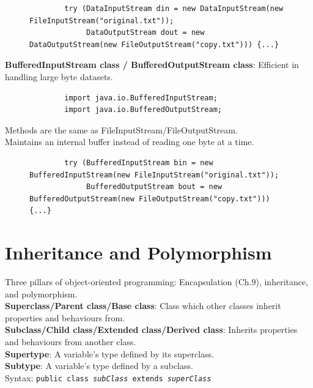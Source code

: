 \documentclass{article}
\begin{document}
\begin{figure}[h!]
	\begin{verbatim}
		try (DataInputStream din = new DataInputStream(new FileInputStream("original.txt"));
		     DataOutputStream dout = new DataOutputStream(new FileOutputStream("copy.txt"))) {...}
	\end{verbatim}
\end{figure}

\textbf{BufferedInputStream class / BufferedOutputStream class}: Efficient in handling large byte datasets.

\begin{figure}[h!]
	\begin{verbatim}
		import java.io.BufferedInputStream;
		import java.io.BufferedOutputStream;
	\end{verbatim}
\end{figure}

Methods are the same as FileInputStream/FileOutputStream.\\
Maintains an internal buffer instead of reading one byte at a time.

\begin{figure}[h!]
	\begin{verbatim}
		try (BufferedInputStream bin = new BufferedInputStream(new FileInputStream("original.txt"));
		     BufferedOutputStream bout = new BufferedOutputStream(new FileOutputStream("copy.txt"))) {...}
	\end{verbatim}
\end{figure}
\newpage

\null
\newpage

\section{Inheritance and Polymorphism}
Three pillars of object-oriented programming: Encapsulation (Ch.9), inheritance, and polymorphism.\\

\textbf{Superclass/Parent class/Base class}: Class which other classes inherit properties and behaviours from.\\
\textbf{Subclass/Child class/Extended class/Derived class}: Inherits properties and behaviours from another class.\\
\textbf{Supertype}: A variable's type defined by its superclass.\\
\textbf{Subtype}: A variable's type defined by a subclass.\\
Syntax: \texttt{public class \textit{subClass} extends \textit{superClass}}\\
\end{document}
